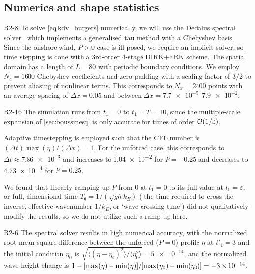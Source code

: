 \documentclass{jfm}
\renewcommand*{\epsilon}{\varepsilon}
\begin{document}
\subsection{\label{sec:numerics} Numerics and shape statistics}
\begin{LineLabel}{R2-8}
To solve \cref{eq:kdv_burgers} numerically, we will use the Dedalus
spectral solver~\citep{burns2020dedalus} which implements a generalized
tau method with a Chebyshev basis.
Since the onshore wind, $P>0$ case is ill-posed, we require an implicit
solver, so time stepping is done with a 3rd-order 4-stage DIRK+ERK
scheme.
The spatial domain has a length of $L=80$ with periodic boundary
conditions.
We employ $N_c = 1600$ Chebyshev coefficients and zero-padding with a
scaling factor of $3/2$ to prevent aliasing of nonlinear terms.
This corresponds to $N_x = 2400$ points with an average
spacing of $\Delta x = 0.05$ and between $\Delta x =
\numrange{7.7e-5}{7.9e-2}$.
\begin{LineLabel}{R2-16}
The simulation runs from $t_1 = 0$ to $t_1 = T = 10$, since the
multiple-scale expansion of \cref{sec:boussinesq} is only accurate for
times of order $\order{1/\epsilon}$.
\end{LineLabel}
Adaptive timestepping is employed such that the CFL number is $(\Delta
t) \max(\eta)/(\Delta x) = 1$.
For the unforced case, this corresponds to $\Delta t \approx
\num{7.86e-3}$ and increases to \num{1.04e-2} for $P=-0.25$ and
decreases to \num{4.73e-4} for $P = 0.25$.
\end{LineLabel}
We found that linearly ramping up $P$ from $0$ at $t_1=0$ to its full
value at $t_1 = \epsilon$, or full, dimensional time $T_0 = 1/(\sqrt{gh}
k_E)$ (\ie{} the time required to cross the inverse, effective
wavenumber $1/k_E$, or `wave-crossing time') did not qualitatively
modify the results, so we do not utilize such a ramp-up here.
\begin{LineLabel}{R2-6}
The spectral solver results in high numerical accuracy, with the
normalized root-mean-square difference between the unforced ($P=0$)
profile $\eta$ at $t'_1=3$ and the initial condition $\eta_0$ is
$\sqrt{\langle (\eta - \eta_0)^2 \rangle/ \langle \eta_0^2 \rangle} =
\num{5e-14}$,
and the normalized wave height change is $1-\bqty{\max(\eta)
- \min(\eta)}/\allowbreak\bqty{\max(\eta_0) - \min(\eta_0)} = \num{-3e-14}$.
\end{LineLabel}
\end{document}
